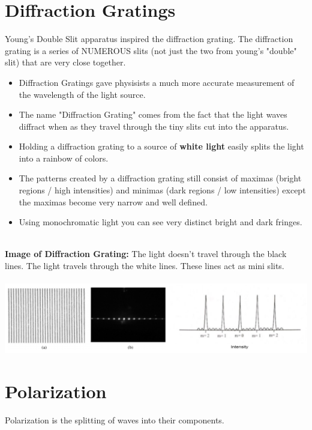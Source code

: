 \documentclass{article}
\begin{document}
\section{Diffraction Gratings}
Young's Double Slit apparatus inspired the diffraction grating. The diffraction grating is a series of NUMEROUS slits (not just the two from young's "double" slit) that are very close together.\\
\begin{itemize}
    \item Diffraction Gratings gave physisists a much more accurate measurement of the wavelength of the light source.
    \item The name "Diffraction Grating" comes from the fact that the light waves diffract when as they travel through the tiny slits cut into the apparatus.
    \item Holding a diffraction grating to a source of \textbf{white light} easily splits the light into a rainbow of colors.
    \item The patterns created by a diffraction grating still consist of maximas (bright regions / high intensities) and minimas (dark regions / low intensities) except the maximas become very narrow and well defined.
    \item Using monochromatic light you can see very distinct bright and dark fringes.
\end{itemize}\leavevmode\\
\noindent\textbf{Image of Diffraction Grating:}
The light doesn't travel through the black lines. The light travels through the white lines. These lines act as mini slits.\\\\
\includegraphics[scale=0.4]{images/diffraction_grating} \\

\section{Polarization}
Polarization is the splitting of waves into their components.
\end{document}

